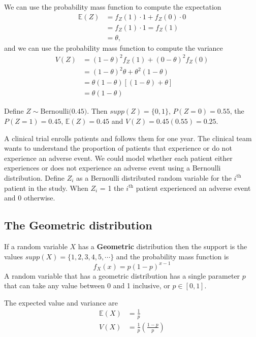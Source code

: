 We can use the probability mass function to compute the expectation
\begin{align}
    \mathbb{E}(Z) &= f_{Z}(1) \cdot 1 + f_{Z}(0) \cdot 0\\
                  &= f_{Z}(1) \cdot 1 = f_{Z}(1)\\
                  &= \theta,
\end{align}
and we can use the probability mass function to compute the variance
\begin{align}
    V(Z) &= (1 - \theta)^{2} f_{Z}(1)+ (0-\theta)^{2} f_{Z}(0) \\
         &= (1 - \theta)^{2} \theta + \theta^{2} (1-\theta)\\
         &= \theta(1-\theta) \left[ (1-\theta) + \theta  \right]\\
         &= \theta(1-\theta)
\end{align}

\ex Define $Z \sim \text{Bernoulli(0.45)}$. Then $supp(Z) = \{0,1\}$, $P(Z=0) = 0.55$, the $P(Z=1) = 0.45$, $\mathbb{E}(Z) = 0.45$ and $V(Z) = 0.45(0.55) = 0.25$. 

\ex A clinical trial enrolls patients and follows them for one year. 
The clinical team wants to understand the proportion of patients that experience or do not experience an adverse event. We could model whether each patient either experiences or does not experience an adverse event using a Bernoulli distribution. Define $Z_{i}$ as a Bernoulli distributed random variable for the $i^\text{th}$ patient in the study. When $Z_{i}$ = 1 the  $i^{\text{th}}$ patient experienced an adverse event and 0 otherwise.


\subsection{The Geometric distribution }

If a random variable $X$ has a \textbf{Geometric} distribution then the support is the values $supp(X) = \{1,2,3,4,5,\cdots\}$ and the probability mass function is 
\begin{equation}
    f_{X}(x) = p(1-p)^{x-1}
\end{equation}
A random variable that has a geometric distribution has a single parameter $p$ that can take any value between 0 and 1 inclusive, or $p \in [0,1]$.

The expected value and variance are
\begin{align}
    \mathbb{E}(X) &= \frac{1}{p} \\ 
    V(X)          &= \frac{1}{p} \left( \frac{1-p}{p} \right) 
\end{align}

